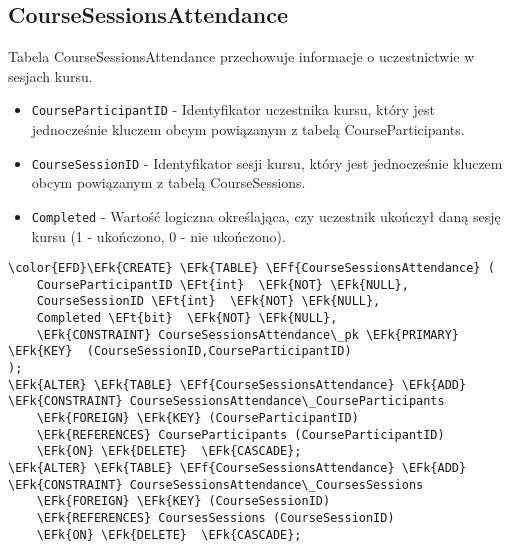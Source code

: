 \documentclass[11pt]{article}
\newcommand{\EFk}[1]{\textcolor{EFk}{\textbf{#1}}} %
\newcommand{\EFf}[1]{\textcolor{EFf}{#1}} %
\newcommand{\EFt}[1]{\textcolor{EFt}{\textbf{#1}}} %
\begin{document}
\subsection{CourseSessionsAttendance}
\label{sec:org9220858}
Tabela CourseSessionsAttendance przechowuje informacje o uczestnictwie w sesjach kursu.
\begin{itemize}
\item \texttt{CourseParticipantID} - Identyfikator uczestnika kursu, który jest jednocześnie kluczem obcym powiązanym z tabelą CourseParticipants.
\item \texttt{CourseSessionID} - Identyfikator sesji kursu, który jest jednocześnie kluczem obcym powiązanym z tabelą CourseSessions.
\item \texttt{Completed} - Wartość logiczna określająca, czy uczestnik ukończył daną sesję kursu (1 - ukończono, 0 - nie ukończono).
\end{itemize}
\begin{Code}
\begin{Verbatim}
\color{EFD}\EFk{CREATE} \EFk{TABLE} \EFf{CourseSessionsAttendance} (
    CourseParticipantID \EFt{int}  \EFk{NOT} \EFk{NULL},
    CourseSessionID \EFt{int}  \EFk{NOT} \EFk{NULL},
    Completed \EFt{bit}  \EFk{NOT} \EFk{NULL},
    \EFk{CONSTRAINT} CourseSessionsAttendance\_pk \EFk{PRIMARY} \EFk{KEY}  (CourseSessionID,CourseParticipantID)
);
\EFk{ALTER} \EFk{TABLE} \EFf{CourseSessionsAttendance} \EFk{ADD} \EFk{CONSTRAINT} CourseSessionsAttendance\_CourseParticipants
    \EFk{FOREIGN} \EFk{KEY} (CourseParticipantID)
    \EFk{REFERENCES} CourseParticipants (CourseParticipantID)
    \EFk{ON} \EFk{DELETE}  \EFk{CASCADE};
\EFk{ALTER} \EFk{TABLE} \EFf{CourseSessionsAttendance} \EFk{ADD} \EFk{CONSTRAINT} CourseSessionsAttendance\_CoursesSessions
    \EFk{FOREIGN} \EFk{KEY} (CourseSessionID)
    \EFk{REFERENCES} CoursesSessions (CourseSessionID)
    \EFk{ON} \EFk{DELETE}  \EFk{CASCADE};
\end{Verbatim}
\end{Code}
\end{document}
